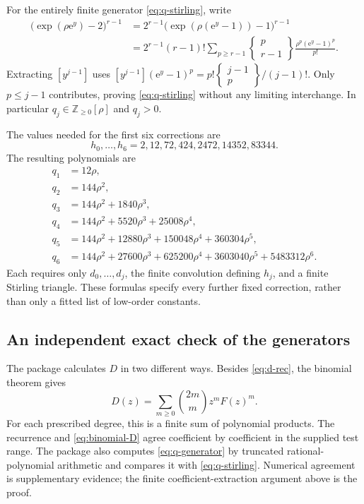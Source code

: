 \documentclass[11pt,letterpaper]{article}
\numberwithin{equation}{section}
\theoremstyle{remark}\newtheorem{remark}[theorem]{Remark}
\newcommand{\e}{\mathrm e}
\newcommand{\stir}[2]{\left\{\begin{smallmatrix}#1\\#2\end{smallmatrix}\right\}}
\begin{document}
For the entirely finite generator \eqref{eq:q-stirling}, write
\begin{align*}
 \bigl(\exp(\rho\e^y)-2\bigr)^{r-1}
 &=2^{r-1}\bigl(\exp(\rho(\e^y-1))-1\bigr)^{r-1}\\
 &=2^{r-1}(r-1)!\sum_{p\ge r-1}
           \stir{p}{r-1}\frac{\rho^p(\e^y-1)^p}{p!}.
\end{align*}
Extracting $[y^{j-1}]$ uses
$[y^{j-1}](\e^y-1)^p=p!\stir{j-1}{p}/(j-1)!$. Only $p\le j-1$ contributes, proving \eqref{eq:q-stirling} without any limiting interchange. In particular $q_j\in\mathbb Z_{\ge0}[\rho]$ and $q_j>0$.

The values needed for the first six corrections are
\[
 h_0,\ldots,h_6=2,12,72,424,2472,14352,83344.
\]
The resulting polynomials are
\begin{align}\label{eq:q-first}
 q_1&=12\rho,\nonumber\\
 q_2&=144\rho^2,\nonumber\\
 q_3&=144\rho^2+1840\rho^3,\nonumber\\
 q_4&=144\rho^2+5520\rho^3+25008\rho^4,\nonumber\\
 q_5&=144\rho^2+12880\rho^3+150048\rho^4+360304\rho^5,\nonumber\\
 q_6&=144\rho^2+27600\rho^3+625200\rho^4
                    +3603040\rho^5+5483312\rho^6.
\end{align}
Each requires only $d_0,\ldots,d_j$, the finite convolution defining $h_j$, and a finite Stirling triangle. These formulas specify every further fixed correction, rather than only a fitted list of low-order constants.

\subsection{An independent exact check of the generators}
The package calculates $D$ in two different ways. Besides \eqref{eq:d-rec}, the binomial theorem gives
\begin{equation}\label{eq:binomial-D}
 D(z)=\sum_{m\ge0}\binom{2m}{m}z^mF(z)^m.
\end{equation}
For each prescribed degree, this is a finite sum of polynomial products. The recurrence and \eqref{eq:binomial-D} agree coefficient by coefficient in the supplied test range. The package also computes \eqref{eq:q-generator} by truncated rational-polynomial arithmetic and compares it with \eqref{eq:q-stirling}. Numerical agreement is supplementary evidence; the finite coefficient-extraction argument above is the proof.
\end{document}
